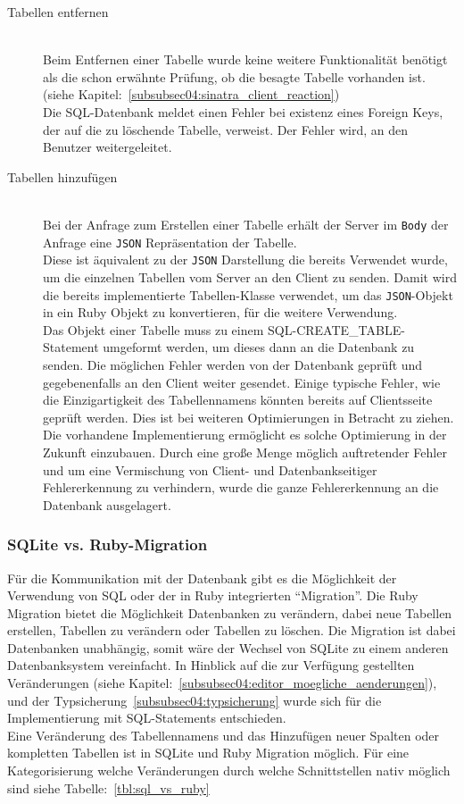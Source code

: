\begin{description}
\item[Tabellen entfernen] \hfill\\
Beim Entfernen einer Tabelle wurde keine weitere Funktionalität benötigt als die schon erwähnte Prüfung, ob die besagte Tabelle vorhanden ist. (siehe Kapitel:~\ref{subsubsec04:sinatra_client_reaction})\\
Die SQL-Datenbank meldet einen Fehler bei existenz eines Foreign Keys, der auf die zu löschende Tabelle, verweist. Der Fehler wird, an den Benutzer weitergeleitet. 

\item[Tabellen hinzufügen] \hfill\\
Bei der Anfrage zum Erstellen einer Tabelle erhält der Server im \texttt{Body} der Anfrage eine \texttt{JSON} Repräsentation der Tabelle. \\
Diese ist äquivalent zu der \texttt{JSON} Darstellung die bereits Verwendet wurde, um die einzelnen Tabellen vom Server an den Client zu senden. Damit wird die bereits implementierte Tabellen-Klasse verwendet, um das \texttt{JSON}-Objekt in ein Ruby Objekt zu konvertieren, für die weitere Verwendung. \\
Das Objekt einer Tabelle muss zu einem SQL-CREATE\_TABLE-Statement umgeformt werden, um dieses dann an die Datenbank zu senden. Die möglichen Fehler werden von der Datenbank geprüft und gegebenenfalls an den Client weiter gesendet. Einige typische Fehler, wie die Einzigartigkeit des Tabellennamens könnten bereits auf Clientsseite geprüft werden. Dies ist bei weiteren Optimierungen in Betracht zu ziehen. Die vorhandene Implementierung ermöglicht es solche Optimierung in der Zukunft einzubauen. Durch eine große Menge möglich auftretender Fehler und um eine Vermischung von Client- und Datenbankseitiger Fehlererkennung zu verhindern, wurde die ganze Fehlererkennung an die Datenbank ausgelagert.
\end{description}

\subsubsection{SQLite vs. Ruby-Migration}
\label{subsubsec04:sql_vs_ruby}
Für die Kommunikation mit der Datenbank gibt es die Möglichkeit der Verwendung von SQL oder der in Ruby integrierten ``Migration''.
Die Ruby Migration bietet die Möglichkeit Datenbanken zu verändern, dabei neue Tabellen erstellen, Tabellen zu verändern oder Tabellen zu löschen. Die Migration ist dabei Datenbanken unabhängig, somit wäre der Wechsel von SQLite zu einem anderen Datenbanksystem vereinfacht. In Hinblick auf die zur Verfügung gestellten Veränderungen (siehe Kapitel:~\ref{subsubsec04:editor_moegliche_aenderungen}), und der Typsicherung~\ref{subsubsec04:typsicherung} wurde sich für die Implementierung mit SQL-Statements entschieden. \\
Eine Veränderung des Tabellennamens und das Hinzufügen neuer Spalten oder kompletten Tabellen ist in SQLite und Ruby Migration möglich. Für eine Kategorisierung welche Veränderungen durch welche Schnittstellen nativ möglich sind siehe Tabelle:~\ref{tbl:sql_vs_ruby}

